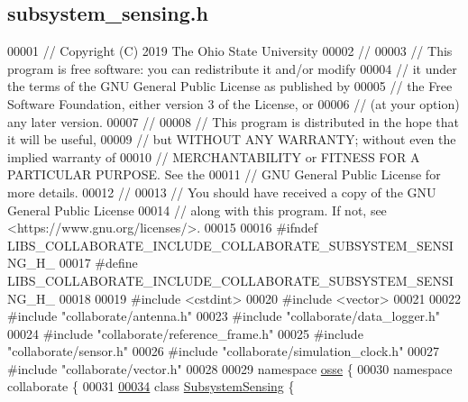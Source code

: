 \hypertarget{subsystem__sensing_8h_source}{}\subsection{subsystem\+\_\+sensing.\+h}
\label{subsystem__sensing_8h_source}

\begin{DoxyCode}
00001 \textcolor{comment}{// Copyright (C) 2019 The Ohio State University}
00002 \textcolor{comment}{//}
00003 \textcolor{comment}{// This program is free software: you can redistribute it and/or modify}
00004 \textcolor{comment}{// it under the terms of the GNU General Public License as published by}
00005 \textcolor{comment}{// the Free Software Foundation, either version 3 of the License, or}
00006 \textcolor{comment}{// (at your option) any later version.}
00007 \textcolor{comment}{//}
00008 \textcolor{comment}{// This program is distributed in the hope that it will be useful,}
00009 \textcolor{comment}{// but WITHOUT ANY WARRANTY; without even the implied warranty of}
00010 \textcolor{comment}{// MERCHANTABILITY or FITNESS FOR A PARTICULAR PURPOSE.  See the}
00011 \textcolor{comment}{// GNU General Public License for more details.}
00012 \textcolor{comment}{//}
00013 \textcolor{comment}{// You should have received a copy of the GNU General Public License}
00014 \textcolor{comment}{// along with this program.  If not, see <https://www.gnu.org/licenses/>.}
00015 
00016 \textcolor{preprocessor}{#ifndef LIBS\_COLLABORATE\_INCLUDE\_COLLABORATE\_SUBSYSTEM\_SENSING\_H\_}
00017 \textcolor{preprocessor}{#define LIBS\_COLLABORATE\_INCLUDE\_COLLABORATE\_SUBSYSTEM\_SENSING\_H\_}
00018 
00019 \textcolor{preprocessor}{#include <cstdint>}
00020 \textcolor{preprocessor}{#include <vector>}
00021 
00022 \textcolor{preprocessor}{#include "collaborate/antenna.h"}
00023 \textcolor{preprocessor}{#include "collaborate/data\_logger.h"}
00024 \textcolor{preprocessor}{#include "collaborate/reference\_frame.h"}
00025 \textcolor{preprocessor}{#include "collaborate/sensor.h"}
00026 \textcolor{preprocessor}{#include "collaborate/simulation\_clock.h"}
00027 \textcolor{preprocessor}{#include "collaborate/vector.h"}
00028 
00029 \textcolor{keyword}{namespace }\hyperlink{namespaceosse}{osse} \{
00030 \textcolor{keyword}{namespace }collaborate \{
00031 
\hyperlink{classosse_1_1collaborate_1_1_subsystem_sensing}{00034} \textcolor{keyword}{class }\hyperlink{classosse_1_1collaborate_1_1_subsystem_sensing}{SubsystemSensing} \{

\end{DoxyCode}
